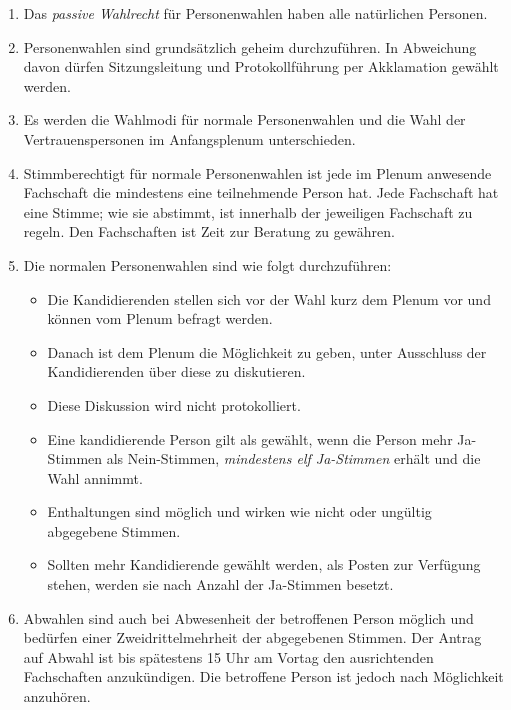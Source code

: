 \documentclass[
  ngerman,
  a4paper,
  oneside]{scrartcl}
\providecommand{\tightlist}{%
  \setlength{\itemsep}{0pt}\setlength{\parskip}{0pt}}
\begin{document}
\begin{enumerate}
\def\labelenumi{\arabic{enumi}.}
\tightlist
\item
  Das \emph{passive Wahlrecht} für Personenwahlen haben alle natürlichen
  Personen.
\item
  Personenwahlen sind grundsätzlich geheim durchzuführen. In Abweichung
  davon dürfen Sitzungsleitung und Protokollführung per Akklamation
  gewählt werden.
\item
  Es werden die Wahlmodi für normale Personenwahlen und die Wahl der
  Vertrauenspersonen im Anfangsplenum unterschieden.
\item
  Stimmberechtigt für normale Personenwahlen ist jede im Plenum
  anwesende Fachschaft die mindestens eine teilnehmende Person hat. Jede
  Fachschaft hat eine Stimme; wie sie abstimmt, ist innerhalb der
  jeweiligen Fachschaft zu regeln. Den Fachschaften ist Zeit zur
  Beratung zu gewähren.
\item
  Die normalen Personenwahlen sind wie folgt durchzuführen:

  \begin{itemize}
  \tightlist
  \item
    Die Kandidierenden stellen sich vor der Wahl kurz dem Plenum vor und
    können vom Plenum befragt werden.
  \item
    Danach ist dem Plenum die Möglichkeit zu geben, unter Ausschluss der
    Kandidierenden über diese zu diskutieren.
  \item
    Diese Diskussion wird nicht protokolliert.
  \item
    Eine kandidierende Person gilt als gewählt, wenn die Person mehr
    Ja-Stimmen als Nein-Stimmen, \emph{mindestens elf Ja-Stimmen} erhält
    und die Wahl annimmt.
  \item
    Enthaltungen sind möglich und wirken wie nicht oder ungültig
    abgegebene Stimmen.
  \item
    Sollten mehr Kandidierende gewählt werden, als Posten zur Verfügung
    stehen, werden sie nach Anzahl der Ja-Stimmen besetzt.
  \end{itemize}
\item
  Abwahlen sind auch bei Abwesenheit der betroffenen Person möglich und
  bedürfen einer Zweidrittelmehrheit der abgegebenen Stimmen. Der Antrag
  auf Abwahl ist bis spätestens 15 Uhr am Vortag den ausrichtenden
  Fachschaften anzukündigen. Die betroffene Person ist jedoch nach
  Möglichkeit anzuhören.
\end{enumerate}
\end{document}
